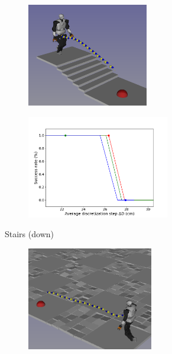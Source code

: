 \begin{figure}[h!]
\begin{subfigure}{0.9\linewidth}
        \label{fig:mip:minimizing_basic:0}
    \end{subfigure}
    \begin{subfigure}{0.9\linewidth}
        \centering
        \begin{subfigure}{0.48\linewidth}
            \includegraphics[trim={1cm 0cm 0cm 0cm},clip,width=\textwidth,height=4.5cm]{Figures/Chapter_MIP_SL1M/res_mip/stairs_down.png}
        \end{subfigure}
        \begin{subfigure}{0.48\linewidth}
            \includegraphics[trim={0cm 0cm 2cm 1.8cm}, clip,width=\textwidth,height=4.5cm]{Figures/Chapter_MIP_SL1M/res_mip/MIP_stairs/FIGURE_MIP_STAIRS_DOWN_2.png}
        \end{subfigure}
        \caption{Stairs (down)}
        \label{fig:mip:minimizing_basic:1}
    \end{subfigure}
    \begin{subfigure}{0.9\linewidth}
        \centering
        \begin{subfigure}{0.48\linewidth}
            \includegraphics[trim={0cm 0cm 0cm 0cm},clip,width=\textwidth,height=4.5cm]{Figures/Chapter_MIP_SL1M/res_mip/scenario_rubbles.png}

\end{subfigure}
\end{subfigure}
\end{figure}
